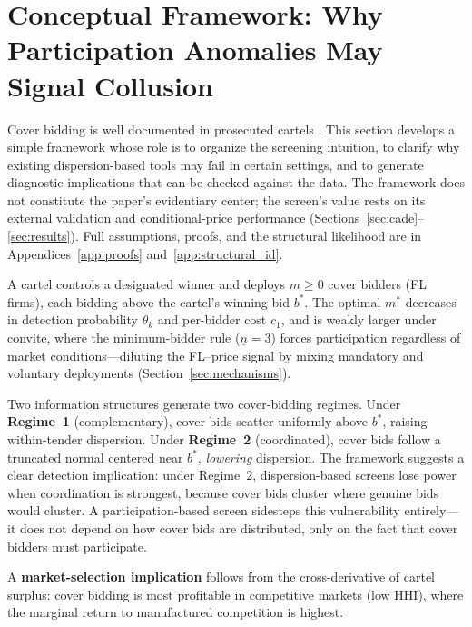 
\section{Conceptual Framework: Why Participation Anomalies May Signal Collusion}
\label{sec:structural}

Cover bidding is well documented in prosecuted cartels
\citep{porter1999ohio, pesendorfer2000study, asker2010leniency,
marshall2012economics}. This section develops a simple framework
whose role is to organize the screening intuition, to clarify why
existing dispersion-based tools may fail in certain settings, and
to generate diagnostic implications that can be checked against
the data. The framework does not constitute the paper's evidentiary
center; the screen's value rests on its external validation and
conditional-price performance (Sections~\ref{sec:cade}--\ref{sec:results}).
Full assumptions, proofs, and the structural likelihood are in
Appendices~\ref{app:proofs} and~\ref{app:structural_id}.

A cartel controls a designated winner and deploys $m \geq 0$ cover
bidders (FL firms), each bidding above the cartel's winning bid
$b^*$. The optimal $m^*$ decreases in detection probability
$\theta_k$ and per-bidder cost $c_1$, and is weakly larger under
convite, where the minimum-bidder rule ($\underline{n} = 3$) forces
participation regardless of market conditions---diluting the FL--price
signal by mixing mandatory and voluntary deployments
(Section~\ref{sec:mechanisms}).

Two information structures generate two cover-bidding regimes.
Under \textbf{Regime~1} (complementary), cover bids scatter uniformly
above $b^*$, raising within-tender dispersion. Under \textbf{Regime~2}
(coordinated), cover bids follow a truncated normal centered near
$b^*$, \emph{lowering} dispersion. The framework suggests a clear detection implication:
under Regime~2, dispersion-based screens lose power when coordination
is strongest, because cover bids cluster where genuine bids would
cluster. A participation-based screen sidesteps this vulnerability
entirely---it does not depend on how cover bids are distributed, only
on the fact that cover bidders must participate.

A \textbf{market-selection implication} follows from the cross-derivative
of cartel surplus: cover bidding is most profitable in competitive
markets (low HHI), where the marginal return to manufactured
competition is highest.

